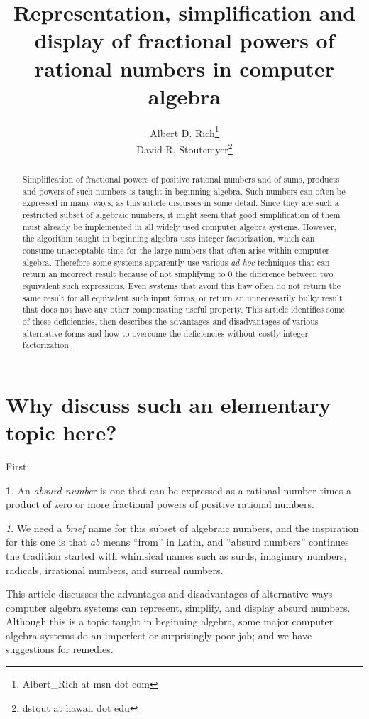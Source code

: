 \documentclass[12pt,english]{article}
\theoremstyle{definition}
\newtheorem*{defn*}{\protect\definitionname}
\theoremstyle{remark}
\newtheorem*{rem*}{\protect\remarkname}
\theoremstyle{plain}
\theoremstyle{plain}
\providecommand{\definitionname}{Definition}
\providecommand{\remarkname}{Remark}
\begin{document}
\title{Representation, simplification and display of fractional powers of
rational numbers in computer algebra}


\author{Albert D. Rich\thanks{Albert\_Rich at msn dot com }\\
David R. Stoutemyer\thanks{dstout at hawaii dot edu}}
\maketitle
\begin{abstract}
Simplification of fractional powers of positive rational numbers and
of sums, products and powers of such numbers is taught in beginning
algebra. Such numbers can often be expressed in many ways, as this
article discusses in some detail. Since they are such a restricted
subset of algebraic numbers, it might seem that good simplification
of them must already be implemented in all widely used computer algebra
systems. However, the algorithm taught in beginning algebra uses integer
factorization, which can consume unacceptable time for the large numbers
that often arise within computer algebra. Therefore some systems apparently
use various \emph{ad hoc} techniques that can return an incorrect
result because of not simplifying to 0 the difference between two
equivalent such expressions. Even systems that avoid this flaw often
do not return the same result for all equivalent such input forms,
or return an unnecessarily bulky result that does not have any other
compensating useful property. This article identifies some of these
deficiencies, then describes the advantages and disadvantages of various
alternative forms and how to overcome the deficiencies without costly
integer factorization.
\end{abstract}

\section{Why discuss such an elementary topic here?}

First:\vspace{-0.3em}

\begin{defn*}
An \textsl{absurd numbe}r is one that can be expressed as a rational
number times a product of zero or more fractional powers of positive
rational numbers.\vspace{-0.2em}
\end{defn*}
\begin{rem*}
We need a \textsl{brief} name for this subset of algebraic numbers,
and the inspiration for this one is that \emph{ab} means ``from''
in Latin, and ``absurd numbers'' continues the tradition started
with whimsical names such as surds, imaginary numbers, radicals, irrational
numbers, and surreal numbers.
\end{rem*}
This article discusses the advantages and disadvantages of alternative
ways computer algebra systems can represent, simplify, and display
absurd numbers. Although this is a topic taught in beginning algebra,
some major computer algebra systems do an imperfect or surprisingly
poor job; and we have suggestions for remedies.
\end{document}
